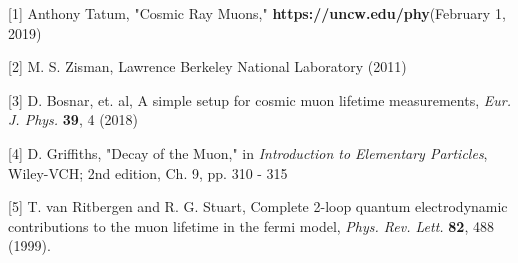 \documentclass{article}
\begin{document}
\hspace{4mm} [1] \hspace{1mm}  Anthony Tatum, "Cosmic Ray Muons," \textbf{https://uncw.edu/phy}\newline (February 1, 2019)

\vspace{3mm}

[2] \hspace{1mm} M. S. Zisman, Lawrence Berkeley National Laboratory (2011)

\vspace{3 mm}



[3] \hspace{1mm}  D. Bosnar, et. al, A simple setup for cosmic muon lifetime measurements, \textit{Eur. J. Phys.} \textbf{39}, 4 (2018)
\vspace{3 mm}

[4] \hspace{1mm} D. Griffiths, "Decay of the Muon," in \textit{Introduction to Elementary Particles}, Wiley-VCH; 2nd edition, Ch. 9, pp. 310 - 315

\vspace{3 mm}

[5] \hspace{1mm} T. van Ritbergen and R. G. Stuart, Complete 2-loop quantum electrodynamic contributions to the muon lifetime in the fermi model, \textit{Phys. Rev. Lett.} \textbf{82}, 488 (1999).
\end{document}
